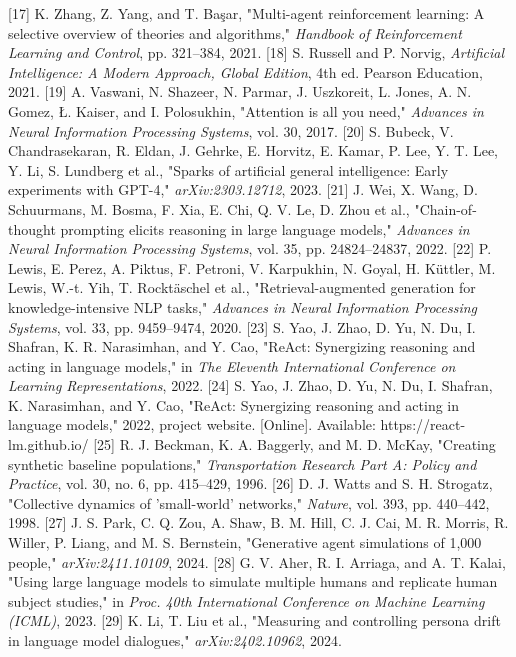 [17] K. Zhang, Z. Yang, and T. Başar, "Multi-agent reinforcement learning: A selective overview of theories and algorithms," \textit{Handbook of Reinforcement Learning and Control}, pp. 321–384, 2021.
[18] S. Russell and P. Norvig, \textit{Artificial Intelligence: A Modern Approach, Global Edition}, 4th ed. Pearson Education, 2021.
[19] A. Vaswani, N. Shazeer, N. Parmar, J. Uszkoreit, L. Jones, A. N. Gomez, Ł. Kaiser, and I. Polosukhin, "Attention is all you need," \textit{Advances in Neural Information Processing Systems}, vol. 30, 2017.
[20] S. Bubeck, V. Chandrasekaran, R. Eldan, J. Gehrke, E. Horvitz, E. Kamar, P. Lee, Y. T. Lee, Y. Li, S. Lundberg et al., "Sparks of artificial general intelligence: Early experiments with GPT-4," \textit{arXiv:2303.12712}, 2023.
[21] J. Wei, X. Wang, D. Schuurmans, M. Bosma, F. Xia, E. Chi, Q. V. Le, D. Zhou et al., "Chain-of-thought prompting elicits reasoning in large language models," \textit{Advances in Neural Information Processing Systems}, vol. 35, pp. 24824–24837, 2022.
[22] P. Lewis, E. Perez, A. Piktus, F. Petroni, V. Karpukhin, N. Goyal, H. Küttler, M. Lewis, W.-t. Yih, T. Rocktäschel et al., "Retrieval-augmented generation for knowledge-intensive NLP tasks," \textit{Advances in Neural Information Processing Systems}, vol. 33, pp. 9459–9474, 2020.
[23] S. Yao, J. Zhao, D. Yu, N. Du, I. Shafran, K. R. Narasimhan, and Y. Cao, "ReAct: Synergizing reasoning and acting in language models," in \textit{The Eleventh International Conference on Learning Representations}, 2022.
[24] S. Yao, J. Zhao, D. Yu, N. Du, I. Shafran, K. Narasimhan, and Y. Cao, "ReAct: Synergizing reasoning and acting in language models," 2022, project website. [Online]. Available: https://react-lm.github.io/
[25] R. J. Beckman, K. A. Baggerly, and M. D. McKay, "Creating synthetic baseline populations," \textit{Transportation Research Part A: Policy and Practice}, vol. 30, no. 6, pp. 415–429, 1996.
[26] D. J. Watts and S. H. Strogatz, "Collective dynamics of 'small-world' networks," \textit{Nature}, vol. 393, pp. 440–442, 1998.
[27] J. S. Park, C. Q. Zou, A. Shaw, B. M. Hill, C. J. Cai, M. R. Morris, R. Willer, P. Liang, and M. S. Bernstein, "Generative agent simulations of 1,000 people," \textit{arXiv:2411.10109}, 2024.
[28] G. V. Aher, R. I. Arriaga, and A. T. Kalai, "Using large language models to simulate multiple humans and replicate human subject studies," in \textit{Proc. 40th International Conference on Machine Learning (ICML)}, 2023.
[29] K. Li, T. Liu et al., "Measuring and controlling persona drift in language model dialogues," \textit{arXiv:2402.10962}, 2024.
